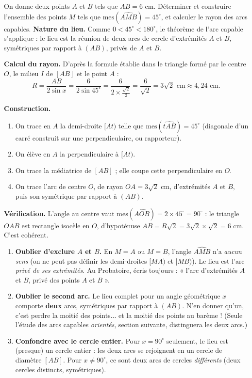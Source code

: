 \documentclass[11pt]{article}
\begin{document}
\begin{exoresolu}[Arc capable pour $AB = 6$ cm et $x = 45^{\circ}$]
On donne deux points $A$ et $B$ tels que $AB = 6$ cm. Déterminer et construire l'ensemble des points $M$ tels que $\text{mes}(\widehat{AMB}) = 45^{\circ}$, et calculer le rayon des arcs capables.
\tcblower
\textbf{Nature du lieu.} Comme $0 < 45^{\circ} < 180^{\circ}$, le théorème de l'arc capable s'applique : le lieu est la réunion de deux arcs de cercle d'extrémités $A$ et $B$, symétriques par rapport à $(AB)$, privés de $A$ et $B$.

\textbf{Calcul du rayon.} D'après la formule établie dans le triangle formé par le centre $O$, le milieu $I$ de $[AB]$ et le point $A$ :
\[
R = \frac{AB}{2\sin x} = \frac{6}{2\sin 45^{\circ}} = \frac{6}{2 \times \frac{\sqrt{2}}{2}} = \frac{6}{\sqrt{2}} = 3\sqrt{2} \text{ cm} \approx 4,24 \text{ cm}.
\]

\textbf{Construction.} 
\begin{enumerate}
\item On trace en $A$ la demi-droite $[At)$ telle que $\text{mes}(\widehat{tAB}) = 45^{\circ}$ (diagonale d'un carré construit sur une perpendiculaire, ou rapporteur).
\item On élève en $A$ la perpendiculaire à $[At)$.
\item On trace la médiatrice de $[AB]$ ; elle coupe cette perpendiculaire en $O$.
\item On trace l'arc de centre $O$, de rayon $OA = 3\sqrt{2}$ cm, d'extrémités $A$ et $B$, puis son symétrique par rapport à $(AB)$.
\end{enumerate}
\textbf{Vérification.} L'angle au centre vaut $\text{mes}(\widehat{AOB}) = 2 \times 45^{\circ} = 90^{\circ}$ : le triangle $OAB$ est rectangle isocèle en $O$, d'hypoténuse $AB = R\sqrt{2} = 3\sqrt{2}\times\sqrt{2} = 6$ cm. C'est cohérent.
\end{exoresolu}

\begin{attention}
\begin{enumerate}
\item \textbf{Oublier d'exclure $A$ et $B$.} En $M = A$ ou $M = B$, l'angle $\widehat{AMB}$ n'a \emph{aucun sens} (on ne peut pas définir les demi-droites $[MA)$ et $[MB)$). Le lieu est l'arc \emph{privé de ses extrémités}. Au Probatoire, écris toujours : « l'arc d'extrémités $A$ et $B$, privé des points $A$ et $B$ ».
\item \textbf{Oublier le second arc.} Le lieu complet pour un angle géométrique $x$ comporte \textbf{deux} arcs, symétriques par rapport à $(AB)$. N'en donner qu'un, c'est perdre la moitié des points... et la moitié des points au barème ! (Seule l'étude des arcs capables \emph{orientés}, section suivante, distinguera les deux arcs.)
\item \textbf{Confondre avec le cercle entier.} Pour $x = 90^{\circ}$ seulement, le lieu est (presque) un cercle entier : les deux arcs se rejoignent en un cercle de diamètre $[AB]$. Pour $x \neq 90^{\circ}$, ce sont deux arcs de cercles \emph{différents} (deux cercles distincts, symétriques).
\end{enumerate}
\end{attention}
\end{document}
